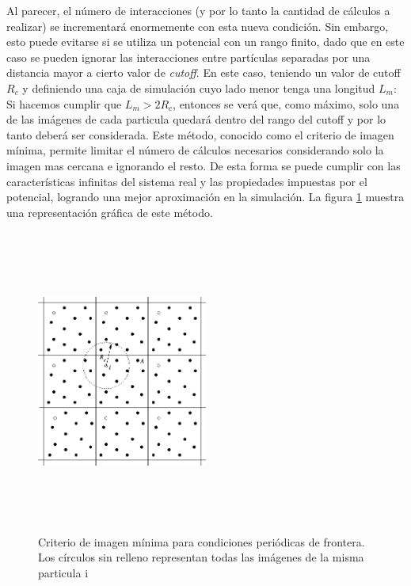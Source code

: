 Al parecer, el número de interacciones (y por lo tanto la cantidad de cálculos a realizar) se incrementará enormemente con esta nueva condición. 
Sin embargo, esto puede evitarse si se utiliza un potencial con un rango finito, dado que en este caso se pueden ignorar las interacciones entre partículas separadas por una distancia mayor a cierto valor de \textit{cutoff}.
En este caso, teniendo un valor de cutoff $R_{c}$ y definiendo una caja de simulación cuyo lado menor tenga una longitud $L_m$: 
Si hacemos cumplir que $L_m>2R_{c}$, entonces se verá que, como máximo, solo una de las imágenes de cada particula quedará dentro del rango del cutoff y por lo tanto deberá ser considerada.
Este método, conocido como el criterio de imagen mínima, permite limitar el número de cálculos necesarios considerando solo la imagen mas cercana e ignorando el resto. 
De esta forma se puede cumplir con las características infinitas del sistema real y las propiedades impuestas por el potencial, logrando una mejor aproximación en la simulación.
La figura \ref{minimage} muestra una representación gráfica de este método. 


\begin{figure}[!ht]
\centering
\includegraphics[keepaspectratio, height=10cm ,width=0.5\textwidth]{img/md/minimage.png}
\caption{Criterio de imagen mínima para condiciones periódicas de frontera. Los círculos sin relleno representan todas las imágenes de la misma particula i}
\label{minimage}
\end{figure}












